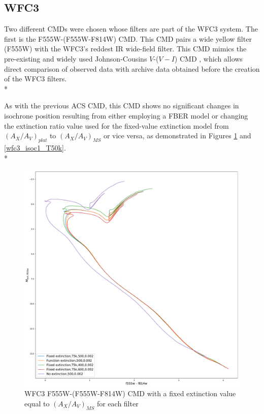 \documentclass[12pt, a4paper]{report}
\begin{document}
\subsection{WFC3} \label{WFC3_isoc}

Two different CMDs were chosen whose filters are part of the WFC3 system. The first is the F555W-(F555W-F814W) CMD. This CMD pairs a wide yellow filter (F555W) with the WFC3's reddest IR wide-field filter. This CMD mimics the pre-existing and widely used Johnson-Cousins $V$-($V-I$) CMD \citep{2014wfc..rept...16S}, which allows direct comparison of observed data with archive data obtained before the creation of the WFC3 filters.\\*

As with the previous ACS CMD, this CMD shows no significant changes in isochrone position resulting from either employing a FBER model or changing the extinction ratio value used for the fixed-value extinction model from $(A_{X}/A_{V})_{plat}$ to $(A_{X}/A_{V})_{MS}$ or vice versa, as demonstrated in Figures \ref{wfc3_isoc1_T5k} and \ref{wfc3_isoc1_T50k}.\\*

\begin{figure}[h!]
\begin{center}
\includegraphics[width=1.0\textwidth]{../basti_isochrones_10_13Gyr/Extinction_T5k_FeH0fix_func_f555w_f555wmf814w_500_400_600_Myr_FeH_0p002_ref_noext_Av_1p0.pdf}
\caption{WFC3 F555W-(F555W-F814W) CMD with a fixed extinction value equal to $(A_{X}/A_{V})_{MS}$ for each filter}
\label{wfc3_isoc1_T5k}
\end{center}
\end{figure}
\end{document}
